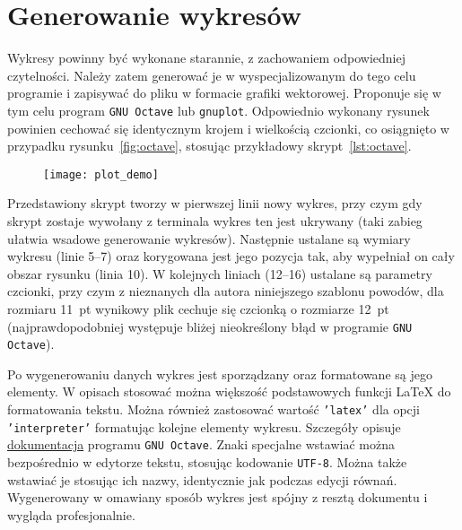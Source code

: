 \chapter{Generowanie wykresów}

Wykresy powinny być wykonane starannie, z zachowaniem odpowiedniej czytelności. Należy zatem generować je w wyspecjalizowanym do tego celu programie i zapisywać do pliku w formacie grafiki wektorowej. Proponuje się w tym celu program \texttt{GNU Octave} lub \texttt{gnuplot}. Odpowiednio wykonany rysunek powinien cechować się identycznym krojem i wielkością czcionki, co osiągnięto w przypadku rysunku~\ref{fig:octave}, stosując przykładowy skrypt~\ref{lst:octave}.

\begin{figure}[htb!]
\centering
\texttt{[image: plot\_demo]}
\end{figure}

Przedstawiony skrypt tworzy w pierwszej linii nowy wykres, przy czym gdy skrypt zostaje wywołany z terminala wykres ten jest ukrywany (taki zabieg ułatwia wsadowe generowanie wykresów). Następnie ustalane są wymiary wykresu (linie 5--7) oraz korygowana jest jego pozycja tak, aby wypełniał on cały obszar rysunku (linia 10). W kolejnych liniach (12--16) ustalane są parametry czcionki, przy czym z nieznanych dla autora niniejszego szablonu powodów, dla rozmiaru \qty{11}{pt} wynikowy plik cechuje się czcionką o rozmiarze \qty{12}{pt} (najprawdopodobniej występuje bliżej nieokreślony błąd w programie \texttt{GNU Octave}).

Po wygenerowaniu danych wykres jest sporządzany oraz formatowane są jego elementy. W opisach stosować można większość podstawowych funkcji \LaTeX{} do formatowania tekstu. Można również zastosować wartość \texttt{'latex'} dla opcji \texttt{'interpreter'} formatując kolejne elementy wykresu. Szczegóły opisuje \href{https://docs.octave.org/latest}{dokumentacja} programu \texttt{GNU Octave}. Znaki specjalne wstawiać można bezpośrednio w edytorze tekstu, stosując kodowanie \texttt{UTF-8}. Można także wstawiać je stosując ich nazwy, identycznie jak podczas edycji równań. Wygenerowany w omawiany sposób wykres jest spójny z resztą dokumentu i wygląda profesjonalnie.

\begin{listing}[hbt!]
\inputminted[linenos, breaklines]{octave}{skrypty/plot_demo.m}
\end{listing}


